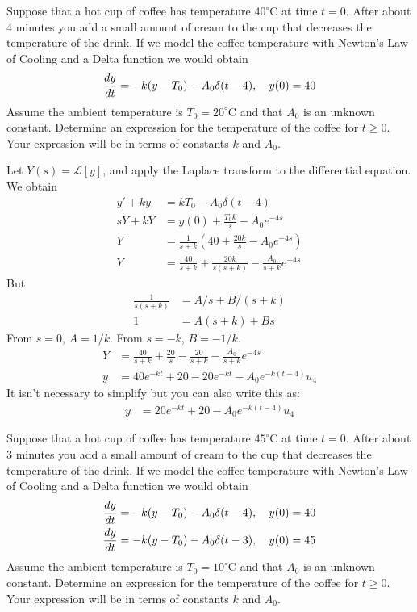 \ifnum {}
\ifnum {} \newpage \fi
\question[4] Suppose that a hot cup of coffee has temperature $40^{\circ}$C at time $t = 0$. After about 4 minutes you add a small amount of cream to the cup that decreases the temperature of the drink. If we model the coffee temperature with Newton's Law of Cooling and a Delta function we would obtain
\begin{align}
    {\frac{dy}{dt}} = -k(y - T_0) - A_0\delta(t-4), \quad y(0) = 40
\end{align}
Assume the ambient temperature is $T_0 = 20^{\circ}$C and that $A_0$ is an unknown constant. Determine an expression for the temperature of the coffee for $t \ge 0$. Your expression will be in terms of constants $k$ and $A_0$. 

    \ifnum {} {\color{DarkBlue} 
    Let $Y (s) = \mathcal L[y]$, and apply the Laplace transform to the differential equation. We obtain
    \begin{align}
        y' + ky &= kT_0 - A_0 \delta(t-4) \\ 
        sY + kY &= y(0) + \frac{T_0k}{s} - A_0e^{-4s} \\
        Y &= \frac{1}{s+k} \left( 40 + \frac{20k}{s} - A_0e^{-4s} \right) \\ 
        Y &= \frac{40}{s+k} + \frac{20k}{s(s+k)} - \frac{A_0}{s+k} e^{-4s} 
    \end{align}
    But 
    \begin{align}
        \frac{1}{s(s+k)} &= A/s + B/(s+k) \\
        1 &= A(s+k) + Bs
    \end{align}
    From $s=0$, $A=1/k$. From $s=-k$, $B = -1/k.$
    \begin{align}
            Y &= \frac{40}{s+k} + \frac{20}{s} - \frac{20}{s+k} - \frac{A_0}{s+k} e^{-4s} \\
            y &= 40 e^{-kt} + 20 - 20e^{-kt} - A_0e^{-k(t-4)}u_4
    \end{align}    
    It isn't necessary to simplify but you can also write this as:
    \begin{align}
        y &= 20 e^{-kt} + 20  - A_0e^{-k(t-4)}u_4
    \end{align}      
    } 
    \else 
    \fi
\fi


\ifnum {}
\ifnum {} \newpage \fi
\question[4] Suppose that a hot cup of coffee has temperature $45^{\circ}$C at time $t = 0$. After about 3 minutes you add a small amount of cream to the cup that decreases the temperature of the drink. If we model the coffee temperature with Newton's Law of Cooling and a Delta function we would obtain
\begin{align}
    {\frac{dy}{dt}} &= -k(y - T_0) - A_0\delta(t-4), \quad y(0) = 40\\
    {\frac{dy}{dt}} &= -k(y - T_0) - A_0\delta(t-3), \quad y(0) = 45
\end{align}
Assume the ambient temperature is $T_0 = 10^{\circ}$C and that $A_0$ is an unknown constant. Determine an expression for the temperature of the coffee for $t \ge 0$. Your expression will be in terms of constants $k$ and $A_0$. 

